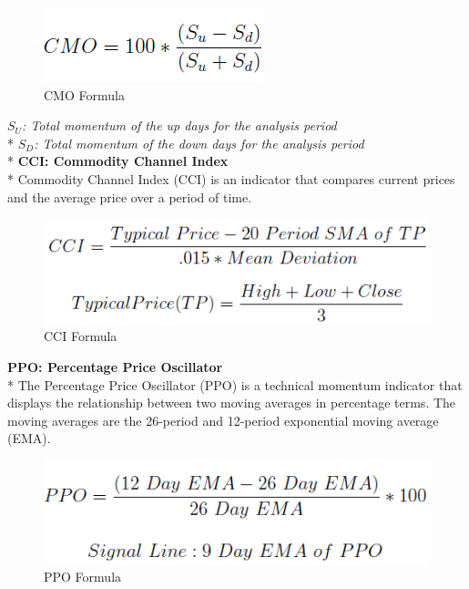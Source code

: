 \documentclass{article}
\begin{document}
\begin{figure}[H]
\begin{center}
   \includegraphics[scale=0.7]{Assets/cmo.png}
   \caption{CMO Formula}
\end{center}
\end{figure}
\noindent
\textit{$S_U$: Total momentum of the up days for the analysis period}\vspace{0.1cm}\\*
\textit{$S_D$: Total momentum of the down days for the analysis period}\vspace{0.2cm}\\*
\textbf{CCI: Commodity Channel Index} \\*
Commodity Channel Index (CCI) is an indicator that compares current prices and the average price over a period of time.
\begin{figure}[H]
\begin{center}
   \includegraphics[scale=0.7]{Assets/cci.png}
   \caption{CCI Formula}
\end{center}
\end{figure}
\noindent
\textbf{PPO: Percentage Price Oscillator} \\*
The Percentage Price Oscillator (PPO) is a technical momentum indicator that displays the relationship between two moving averages in percentage terms. The moving averages are the 26-period and 12-period exponential moving average (EMA).
\begin{figure}[H]
\begin{center}
   \includegraphics[scale=0.7]{Assets/ppo.png}
   \caption{PPO Formula}
\end{center}
\end{figure}
\end{document}
